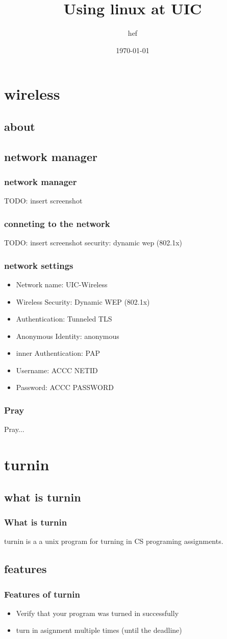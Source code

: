 \documentclass[hyperref={pdfpagelabels=false}]{beamer}
\title{Using linux at UIC}
\author{hef}
\date{\today}
\begin{document}
\frame{\titlepage}
\section[outline]{}
\frame{\tableofcontents}
\section{wireless}
\subsection{about}
\subsection{network manager}
\frame
{
    \frametitle{network manager}
    TODO: insert screenshot
}
\frame
{
    \frametitle{conneting to the network}
    TODO: insert screenshot
    security: dynamic wep (802.1x)
}
\frame
{
    \frametitle{network settings}
    \begin{itemize}
    \item{Network name: UIC-Wireless}
    \item{Wireless Security: Dynamic WEP (802.1x)}
    \item{Authentication: Tunneled TLS}
    \item{Anonymous Identity: anonymous}
    \item{inner Authentication: PAP}
    \item{Username: ACCC NETID}
    \item{Password: ACCC PASSWORD}
    \end{itemize}
}
\frame
{
    \frametitle{Pray}
    Pray...
}
\section{turnin}
\subsection{what is turnin}
\frame
{
    \frametitle{What is turnin}
    turnin is a a unix program for turning in CS programing assignments.
}

\subsection{features}
\frame
{
    \frametitle{Features of turnin}
    \begin{itemize}
    \item{Verify that your program was turned in successfully}
    \item{turn in asignment multiple times (until the deadline)}
    \end{itemize}
}
\end{document}

